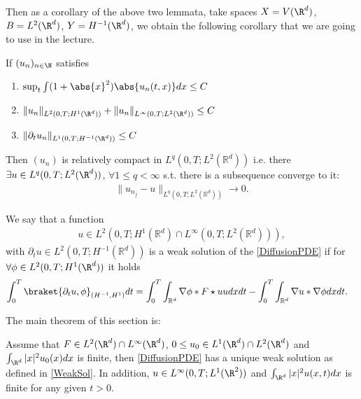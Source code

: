 \vskip3mm

Then as a corollary of the above two lemmata, take spaces $X=V(\R^d)$, $B=L^2(\R^d)$, $Y=H^{-1}(\R^d)$, we obtain the following corollary that we are going to use in the lecture.

\begin{lemma}\label{aubin}
	If  $(u_n)_{n\in\N}$ satisfies
	\begin{enumerate}
		\item $\sup_t \int  (1+\abs{x}^2) \abs{u_n(t,x)} dx \le C$
		\item  $\|u_n\|_{L^{2}(0,T; H^{1}(\R^d) ) }+\|u_n\|_{L^\infty(0,T;L^2(\R^d))}\le C$ 
		\item $\|\partial_t u_n\|_{L^1(0,T;H^{-1}(\R^d) ) }\le C$
	\end{enumerate}
	Then $(u_n)$ is relatively compact in $L^{q}(0,T;L^{2}(\mathbb{R}^{d} ) ) $ i.e. there $\exists  u \in L^q(0,T;L^{2} (\R^d)) $, $\forall 1\leq q<\infty $ s.t. there is a subsequence converge to it:
	\begin{align*}
	\|u_{n_j} - u\|_{L^{q}(0,T;L^{2}(\mathbb{R}^{d} ) ) } \to 0
	.\end{align*}
\end{lemma}


\begin{definition}\label{WeakSol}
	We say that a function 
	\begin{align*}
	u \in  L^2(0,T;H^{1}(\mathbb{R}^{d} )\cap L^{\infty}(0,T;L^2(\mathbb{R}^{d} ))  )
	,\end{align*}
	with $\partial_t u \in  L^2(0,T;H^{-1}(\mathbb{R}^{d} ))$ is a weak solution of the \autoref{DiffusionPDE} if for
	$\forall  \phi  \in L^2(0,T;H^1(\R^d) )  $ it holds 
	\begin{align*}
	\int_0^{T} \braket{\partial_t u , \phi }_{(H^{-1},H^{1})} dt &= \int_0^{T} \int_{\mathbb{R}^{d} }  \nabla \phi * F\star u u dx dt - \int_0^{T} \int_{\mathbb{R}^{d} }  \nabla u * \nabla \phi  dx dt
	.\end{align*} 
\end{definition}

\vskip5mm
The main theorem of this section is:
\begin{theorem}\label{PDEtheorem}
	Assume that $F\in L^2(\R^d)\cap L^\infty(\R^d)$, $0\leq u_0\in L^1(\R^d)\cap L^2(\R^d)$ and $\int_{\R^d}|x|^2u_0(x)dx$ is finite, then \autoref{DiffusionPDE} has a unique weak solution as defined in \autoref{WeakSol}. In addition, $u\in L^\infty(0,T;L^1(\R^2))$ and $\int_{\R^d}|x|^2u(x,t)dx$ is finite for any given $t>0$.
\end{theorem}

